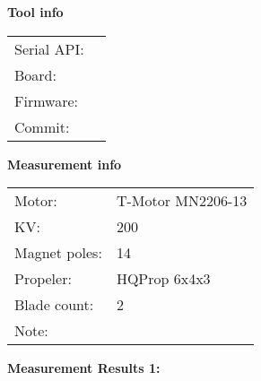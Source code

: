 \documentclass[10pt]{article}
\begin{document}
\noindent
{\large \bf Tool info}
\vspace{3mm}

\noindent
\begin{tabular}{ll}
Serial API:  & \\ 
Board:       & \\ 
Firmware:    & \\ 
Commit:      & 
\end{tabular}
\vspace{3mm}

\noindent
{\large \bf Measurement info}
\vspace{3mm}

\noindent
\begin{tabular}{ll}
Motor:        & T-Motor MN2206-13\\ 
KV:           & 200\\ 
Magnet poles: & 14\\ 
Propeler:     & HQProp 6x4x3\\ 
Blade count:  & 2\\ 
Note:         & 
\end{tabular}

\vspace{3mm}

\noindent
{\large \bf Measurement Results 1:}
\vspace{3mm}
\end{document}
